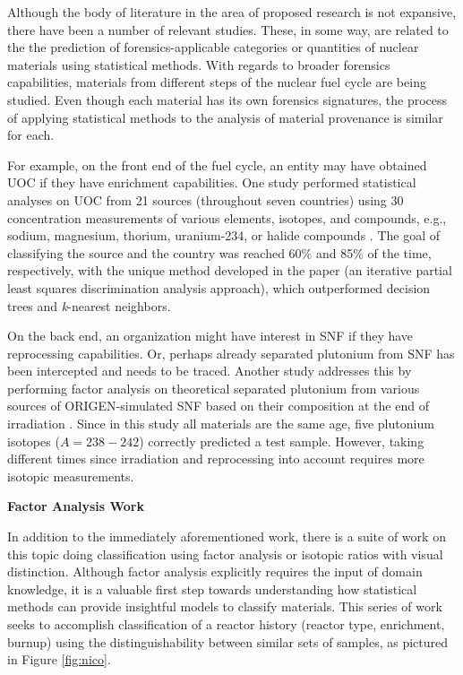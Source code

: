 
Although the body of literature in the area of proposed research is not
expansive, there have been a number of relevant studies. These, in some way,
are related to the the prediction of forensics-applicable categories or
quantities of nuclear materials using statistical methods.  With regards to
broader forensics capabilities, materials from different steps of the nuclear
fuel cycle are being studied.  Even though each material has its own forensics
signatures, the process of applying statistical methods to the analysis of
material provenance is similar for each. 

For example, on the front end of the fuel cycle, an entity may have obtained
\gls{UOC} if they have enrichment capabilities.  One study performed
statistical analyses on \gls{UOC} from 21 sources (throughout seven countries)
using 30 concentration measurements of various elements, isotopes, and
compounds, e.g., sodium, magnesium, thorium, uranium-234, or halide compounds
\cite{robel_2009}.  The goal of classifying the source and the country was
reached 60\% and 85\% of the time, respectively, with the unique method
developed in the paper (an iterative partial least squares discrimination
analysis approach), which outperformed decision trees and \textit{k}-nearest
neighbors.

On the back end, an organization might have interest in \gls{SNF} if they have
reprocessing capabilities.  Or, perhaps already separated plutonium from
\gls{SNF} has been intercepted and needs to be traced. Another study addresses
this by performing factor analysis on theoretical separated plutonium from
various sources of \gls{ORIGEN}-simulated \gls{SNF} based on their composition
at the end of irradiation \cite{nicolaou_pu}.  Since in this study all
materials are the same age, five plutonium isotopes ($A = 238-242$) correctly
predicted a test sample. However, taking different times since irradiation and
reprocessing into account requires more isotopic measurements. 

\noindent \textbf{Factor Analysis Work}

In addition to the immediately aforementioned work, there is a suite of work on
this topic doing classification using factor analysis or isotopic ratios with
visual distinction.  Although factor analysis explicitly requires the input of
domain knowledge, it is a valuable first step towards understanding how
statistical methods can provide insightful models to classify materials.  This
series of work seeks to accomplish classification of a reactor history (reactor
type, enrichment, burnup) using the distinguishability between similar sets of
samples, as pictured in Figure \ref{fig:nico}.

